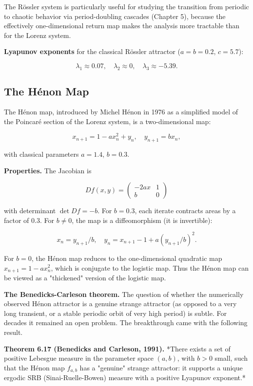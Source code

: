 The Rössler system is particularly useful for studying the transition from periodic to chaotic behavior via period-doubling cascades (Chapter 5), because the effectively one-dimensional return map makes the analysis more tractable than for the Lorenz system.

\textbf{Lyapunov exponents} for the classical Rössler attractor ($a = b = 0.2$, $c = 5.7$):

\[
\lambda_1 \approx 0.07, \quad \lambda_2 \approx 0, \quad \lambda_3 \approx -5.39.
\]

\subsection{The Hénon Map}\label{sec:6.4.5}

The Hénon map, introduced by Michel Hénon in 1976 as a simplified model of the Poincaré section of the Lorenz system, is a two-dimensional map:

\[
x_{n+1} = 1 - ax_n^2 + y_n, \quad y_{n+1} = bx_n,
\]

with classical parameters $a = 1.4$, $b = 0.3$.

\textbf{Properties.} The Jacobian is

\[
D f(x,y) = \begin{pmatrix} -2ax & 1 \\ b & 0 \end{pmatrix}
\]

with determinant $\det Df = -b$. For $b = 0.3$, each iterate contracts areas by a factor of $0.3$. For $b \neq 0$, the map is a diffeomorphism (it is invertible):

\[
x_n = y_{n+1}/b, \quad y_n = x_{n+1} - 1 + a(y_{n+1}/b)^2.
\]

For $b = 0$, the Hénon map reduces to the one-dimensional quadratic map $x_{n+1} = 1 - ax_n^2$, which is conjugate to the logistic map. Thus the Hénon map can be viewed as a "thickened" version of the logistic map.

\textbf{The Benedicks-Carleson theorem.} The question of whether the numerically observed Hénon attractor is a genuine strange attractor (as opposed to a very long transient, or a stable periodic orbit of very high period) is subtle. For decades it remained an open problem. The breakthrough came with the following result.

\textbf{Theorem 6.17 (Benedicks and Carleson, 1991).} *There exists a set of positive Lebesgue measure in the parameter space $(a,b)$, with $b > 0$ small, such that the Hénon map $f_{a,b}$ has a "genuine" strange attractor: it supports a unique ergodic SRB (Sinai-Ruelle-Bowen) measure with a positive Lyapunov exponent.*

